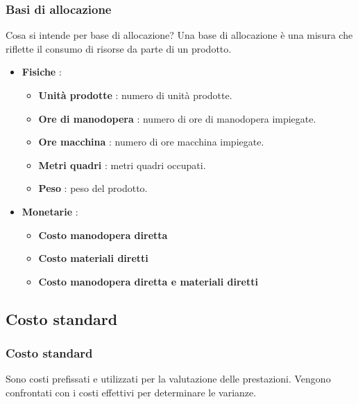 \documentclass[a4paper,10pt]{article}
\begin{document}
\subsubsection{Basi di allocazione}
Cosa si intende per base di allocazione? Una base di allocazione è una misura che riflette il consumo di risorse da parte di un prodotto.
\begin{itemize}
    \item \textbf{Fisiche} : \begin{itemize}
              \item \textbf{Unità prodotte} : numero di unità prodotte.
              \item \textbf{Ore di manodopera} : numero di ore di manodopera impiegate.
              \item \textbf{Ore macchina} : numero di ore macchina impiegate.
              \item \textbf{Metri quadri} : metri quadri occupati.
              \item \textbf{Peso} : peso del prodotto.
          \end{itemize}
    \item \textbf{Monetarie} :
          \begin{itemize}
              \item \textbf{Costo manodopera diretta}
              \item \textbf{Costo materiali diretti}
              \item \textbf{Costo manodopera diretta e materiali diretti}
          \end{itemize}
\end{itemize}



\subsection{Costo standard}
\subsubsection{Costo standard}
Sono costi prefissati e utilizzati per la valutazione delle prestazioni. Vengono confrontati con i costi effettivi per determinare le varianze.
\end{document}
